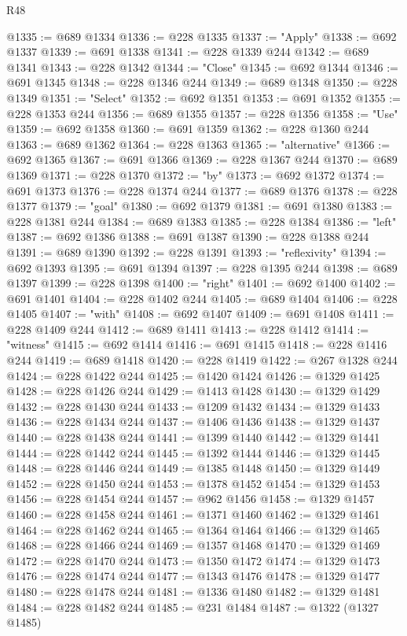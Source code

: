 \begin{lexlean}{R48}
\begin{coremodule}
@1335 := @689 @1334
@1336 := @228 @1335
@1337 := "Apply"
@1338 := @692 @1337
@1339 := @691 @1338
@1341 := @228 @1339 @244
@1342 := @689 @1341
@1343 := @228 @1342
@1344 := "Close"
@1345 := @692 @1344
@1346 := @691 @1345
@1348 := @228 @1346 @244
@1349 := @689 @1348
@1350 := @228 @1349
@1351 := "Select"
@1352 := @692 @1351
@1353 := @691 @1352
@1355 := @228 @1353 @244
@1356 := @689 @1355
@1357 := @228 @1356
@1358 := "Use"
@1359 := @692 @1358
@1360 := @691 @1359
@1362 := @228 @1360 @244
@1363 := @689 @1362
@1364 := @228 @1363
@1365 := "alternative"
@1366 := @692 @1365
@1367 := @691 @1366
@1369 := @228 @1367 @244
@1370 := @689 @1369
@1371 := @228 @1370
@1372 := "by"
@1373 := @692 @1372
@1374 := @691 @1373
@1376 := @228 @1374 @244
@1377 := @689 @1376
@1378 := @228 @1377
@1379 := "goal"
@1380 := @692 @1379
@1381 := @691 @1380
@1383 := @228 @1381 @244
@1384 := @689 @1383
@1385 := @228 @1384
@1386 := "left"
@1387 := @692 @1386
@1388 := @691 @1387
@1390 := @228 @1388 @244
@1391 := @689 @1390
@1392 := @228 @1391
@1393 := "reflexivity"
@1394 := @692 @1393
@1395 := @691 @1394
@1397 := @228 @1395 @244
@1398 := @689 @1397
@1399 := @228 @1398
@1400 := "right"
@1401 := @692 @1400
@1402 := @691 @1401
@1404 := @228 @1402 @244
@1405 := @689 @1404
@1406 := @228 @1405
@1407 := "with"
@1408 := @692 @1407
@1409 := @691 @1408
@1411 := @228 @1409 @244
@1412 := @689 @1411
@1413 := @228 @1412
@1414 := "witness"
@1415 := @692 @1414
@1416 := @691 @1415
@1418 := @228 @1416 @244
@1419 := @689 @1418
@1420 := @228 @1419
@1422 := @267 @1328 @244
@1424 := @228 @1422 @244
@1425 := @1420 @1424
@1426 := @1329 @1425
@1428 := @228 @1426 @244
@1429 := @1413 @1428
@1430 := @1329 @1429
@1432 := @228 @1430 @244
@1433 := @1209 @1432
@1434 := @1329 @1433
@1436 := @228 @1434 @244
@1437 := @1406 @1436
@1438 := @1329 @1437
@1440 := @228 @1438 @244
@1441 := @1399 @1440
@1442 := @1329 @1441
@1444 := @228 @1442 @244
@1445 := @1392 @1444
@1446 := @1329 @1445
@1448 := @228 @1446 @244
@1449 := @1385 @1448
@1450 := @1329 @1449
@1452 := @228 @1450 @244
@1453 := @1378 @1452
@1454 := @1329 @1453
@1456 := @228 @1454 @244
@1457 := @962 @1456
@1458 := @1329 @1457
@1460 := @228 @1458 @244
@1461 := @1371 @1460
@1462 := @1329 @1461
@1464 := @228 @1462 @244
@1465 := @1364 @1464
@1466 := @1329 @1465
@1468 := @228 @1466 @244
@1469 := @1357 @1468
@1470 := @1329 @1469
@1472 := @228 @1470 @244
@1473 := @1350 @1472
@1474 := @1329 @1473
@1476 := @228 @1474 @244
@1477 := @1343 @1476
@1478 := @1329 @1477
@1480 := @228 @1478 @244
@1481 := @1336 @1480
@1482 := @1329 @1481
@1484 := @228 @1482 @244
@1485 := @231 @1484
@1487 := @1322 (@1327 @1485)

\end{coremodule}
\end{lexlean}
